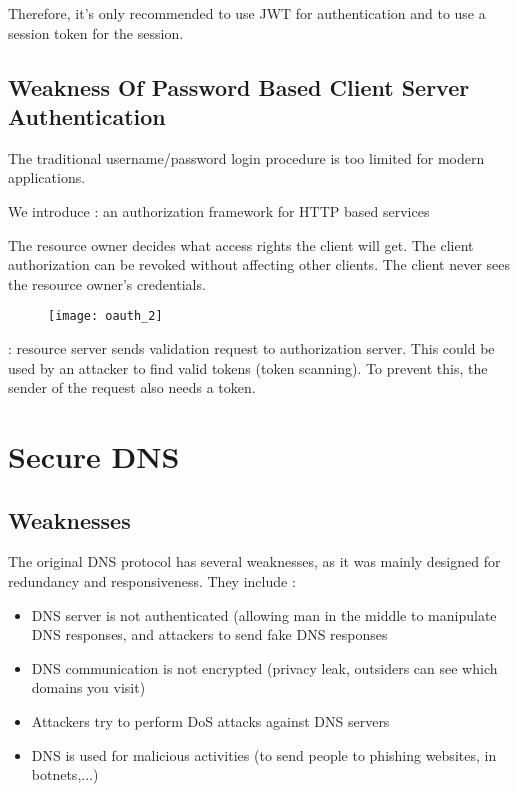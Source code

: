Therefore, it’s only recommended to use JWT for authentication and to use a session token for the session.

\section{Weakness Of Password Based Client Server Authentication}

The traditional username/password login procedure is too limited for modern applications. 

We introduce  : an authorization framework for HTTP based services

The resource owner decides what access rights the client will get. The client authorization can be revoked without affecting other clients. The client never sees the resource owner's credentials.

\begin{figure}[H]
    \centering
    \texttt{[image: oauth\_2]}
\end{figure}

 : resource server sends validation request to authorization server. This could be used by an attacker to find valid tokens (token scanning). To prevent this, the sender of the request also needs a token.

\chapter{Secure DNS}

\section{Weaknesses}

The original DNS protocol has several weaknesses, as it was mainly designed for redundancy and responsiveness. They include :
\begin{itemize}
    \item DNS server is not authenticated (allowing man in the middle to manipulate DNS responses, and attackers to send fake DNS responses
    \item DNS communication is not encrypted (privacy leak, outsiders can see which domains you visit)
    \item Attackers try to perform DoS attacks against DNS servers
    \item DNS is used for malicious activities (to send people to phishing websites, in botnets,...)
\end{itemize}

